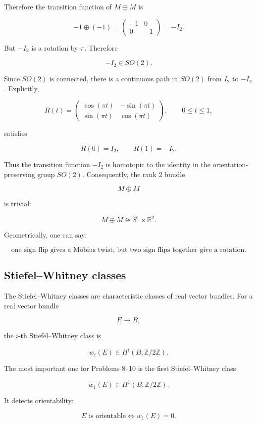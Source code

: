 \documentclass[12pt,a4paper]{article}
\newcommand{\R}{\mathbb{R}}
\newcommand{\Ztwo}{\mathbb{Z}/2\mathbb{Z}}
\theoremstyle{notespace}
\begin{document}
	Therefore the transition function of \(M\oplus M\) is
	
	\[
	-1\oplus (-1)
	=
	\begin{pmatrix}
		-1&0\\
		0&-1
	\end{pmatrix}
	=
	-I_{2}.
	\]
	
	But \(-I_{2}\) is a rotation by \(\pi\). Therefore
	
	\[
	-I_{2}\in SO(2).
	\]
	
	Since \(SO(2)\) is connected, there is a continuous path in \(SO(2)\) from \(I_{2}\) to \(-I_{2}\). Explicitly,
	
	\[
	R(t)=
	\begin{pmatrix}
		\cos(\pi t)&-\sin(\pi t)\\
		\sin(\pi t)&\cos(\pi t)
	\end{pmatrix},
	\qquad 0\leq t\leq 1,
	\]
	
	satisfies
	
	\[
	R(0)=I_{2},
	\qquad
	R(1)=-I_{2}.
	\]
	
	Thus the transition function \(-I_{2}\) is homotopic to the identity in the orientation-preserving group \(SO(2)\). Consequently, the rank \(2\) bundle
	
	\[
	M\oplus M
	\]
	
	is trivial:
	
	\[
	M\oplus M\cong S^{1}\times \R^{2}.
	\]
	
	Geometrically, one can say:
	
	\[
	\boxed{
		\text{one sign flip gives a M\"obius twist, but two sign flips together give a rotation.}
	}
	\]
	
	\subsection{Stiefel--Whitney classes}
	
	The Stiefel--Whitney classes are characteristic classes of real vector bundles. For a real vector bundle
	
	\[
	E\to B,
	\]
	
	the \(i\)-th Stiefel--Whitney class is
	
	\[
	w_i(E)\in H^{i}(B;\Ztwo).
	\]
	
	The most important one for Problems 8--10 is the first Stiefel--Whitney class
	
	\[
	w_1(E)\in H^{1}(B;\Ztwo).
	\]
	
	It detects orientability:
	
	\[
	\boxed{
		E\text{ is orientable}
		\Longleftrightarrow
		w_1(E)=0.
	}
	\]
	
\end{document}
